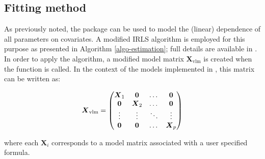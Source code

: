 \documentclass[
]{jss}
\newcommand{\1}{\mathcal{I}} \newcommand{\bZero}{\boldsymbol{0}}
\begin{document}
\subsection{Fitting method}\label{fitting-method}

As previously noted, the  package can be used to
model the (linear) dependence of all parameters on covariates. A
modified IRLS algorithm is employed for this purpose as presented in
Algorithm \ref{algo-estimation}; full details are available in
\cite{VGAM-main}. In order to apply the algorithm, a modified model
matrix \(\boldsymbol{X}_{\text{vlm}}\) is created when the
 function is called. In the context of the models
implemented in , this matrix can be written as:

\begin{equation}\label{X_vlm-definition}
  \boldsymbol{X}_{\text{vlm}}=
  \begin{pmatrix}
    \boldsymbol{X}_{1} & \boldsymbol{0}&\dotso &\boldsymbol{0}\cr
    \boldsymbol{0}& \boldsymbol{X}_{2} &\dotso &\boldsymbol{0}\cr
    \vdots & \vdots & \ddots & \vdots\cr
    \boldsymbol{0}& \boldsymbol{0}&\dotso &\boldsymbol{X}_{p}
  \end{pmatrix}
\end{equation}

where each \(\boldsymbol{X}_{i}\) corresponds to a model matrix
associated with a user specified formula.
\end{document}
